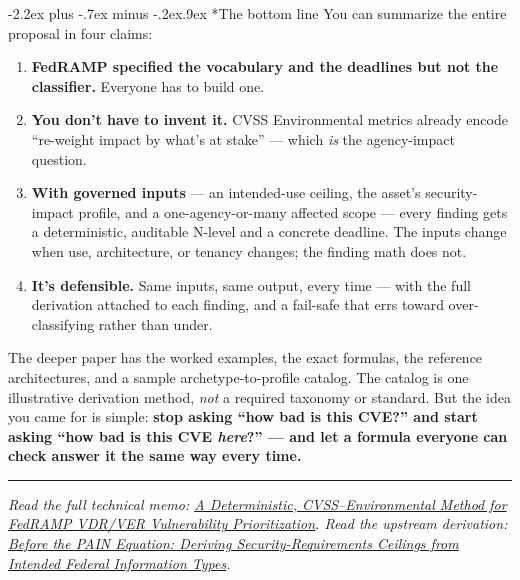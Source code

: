 \documentclass[11pt]{article}
\makeatletter
\renewcommand\section{\@startsection{section}{1}{\z@}%
  {-2.2ex plus -.7ex minus -.2ex}{.9ex}%
  {\normalfont\Large\bfseries}}
\makeatother
\begin{document}
\section*{The bottom line}
You can summarize the entire proposal in four claims:
\begin{enumerate}[leftmargin=1.8em]
\item \textbf{FedRAMP specified the vocabulary and the deadlines but not the
  classifier.} Everyone has to build one.
\item \textbf{You don't have to invent it.} CVSS Environmental metrics already
  encode ``re-weight impact by what's at stake'' --- which \emph{is} the
  agency-impact question.
\item \textbf{With governed inputs} --- an intended-use ceiling, the asset's
  security-impact profile, and a one-agency-or-many affected scope --- every finding gets a
  deterministic, auditable N-level and a concrete deadline. The inputs change
  when use, architecture, or tenancy changes; the finding math does not.
\item \textbf{It's defensible.} Same inputs, same output, every time --- with the
  full derivation attached to each finding, and a fail-safe that errs toward
  over-classifying rather than under.
\end{enumerate}

The deeper paper has the worked examples, the exact formulas, the reference
architectures, and a sample archetype-to-profile catalog. The catalog is one
illustrative derivation method, \emph{not} a required taxonomy or standard. But the
idea you came for
is simple: \textbf{stop asking ``how bad is this CVE?'' and start asking ``how bad
is this CVE \emph{here}?'' --- and let a formula everyone can check answer it the
same way every time.}

\bigskip
\noindent\textcolor{rule}{\rule{\textwidth}{0.4pt}}
\medskip

\noindent\emph{Read the full technical memo:
\href{https://stackarmor.github.io/rfc-fedramp-vdr/vdr-pain-cvss.pdf}{A
Deterministic, CVSS--Environmental Method for FedRAMP VDR/VER Vulnerability
Prioritization}. Read the upstream derivation:
\href{https://stackarmor.github.io/rfc-fedramp-vdr/vdr-pain-security-requirements.pdf}{Before
the PAIN Equation: Deriving Security-Requirements Ceilings from Intended Federal
Information Types}.}
\end{document}
